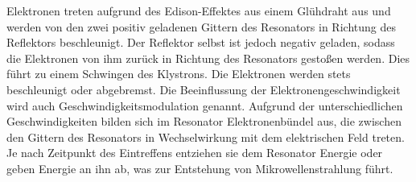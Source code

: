 Elektronen treten aufgrund des Edison-Effektes aus einem Glühdraht aus und werden von den zwei positiv geladenen Gittern des Resonators in Richtung des Reflektors beschleunigt.
Der Reflektor selbst ist jedoch negativ geladen, sodass die Elektronen von ihm zurück in Richtung des Resonators gestoßen werden.
Dies führt zu einem Schwingen des Klystrons.
Die Elektronen werden stets beschleunigt oder abgebremst.
Die Beeinflussung der Elektronengeschwindigkeit wird auch Geschwindigkeitsmodulation genannt.
Aufgrund der unterschiedlichen Geschwindigkeiten bilden sich im Resonator Elektronenbündel aus, die zwischen den Gittern des Resonators in Wechselwirkung mit dem elektrischen Feld treten.
Je nach Zeitpunkt des Eintreffens entziehen sie dem Resonator Energie oder geben Energie an ihn ab, was zur Entstehung von Mikrowellenstrahlung führt.

